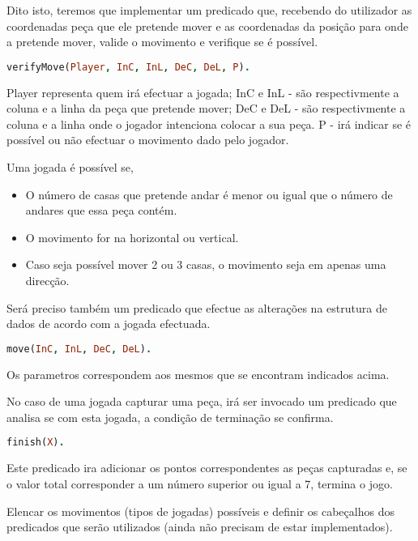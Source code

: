 \documentclass[a4paper]{article}
\begin{document}
Dito isto, teremos que implementar um predicado que, recebendo do utilizador as coordenadas peça que ele pretende mover e as coordenadas da posição para onde a pretende mover, valide o movimento e verifique se é possível.
\bigskip
\begin{lstlisting}[language=Prolog]
verifyMove(Player, InC, InL, DeC, DeL, P).
\end{lstlisting}
\bigskip

Player representa quem irá efectuar a jogada;
\newline
InC e InL - são respectivmente a coluna e a linha da peça que pretende mover;\newline
DeC e DeL - são respectivmente a coluna e a linha onde o jogador intenciona 		colocar a sua peça.\newline
P - irá indicar se é possível ou não efectuar o movimento dado pelo jogador.
\bigskip

Uma jogada é possível se,
\begin{itemize}
	\item O número de casas que pretende andar é menor ou igual que o número de andares que essa peça contém.
	\item O movimento for na horizontal ou vertical.
	\item Caso seja possível mover 2 ou 3 casas, o movimento seja em apenas uma direcção.
	
\end{itemize}
\bigskip

Será preciso também um predicado que efectue as alterações na estrutura de dados de acordo com a jogada efectuada.
\bigskip
\begin{lstlisting}[language=Prolog]
move(InC, InL, DeC, DeL).
\end{lstlisting}
\bigskip

Os parametros correspondem aos mesmos que se encontram indicados acima.
\bigskip

No caso de uma jogada capturar uma peça, irá ser invocado um predicado que analisa se com esta jogada, a condição de terminação se confirma.
\begin{lstlisting}[language=Prolog]
finish(X).
\end{lstlisting}
\newline
Este predicado ira adicionar os pontos correspondentes as peças capturadas e, se o valor total corresponder a um número superior ou igual a 7, termina o jogo.

\bigskip
Elencar os movimentos (tipos de jogadas) possíveis e definir os cabeçalhos dos predicados que serão utilizados (ainda não precisam de estar implementados).
\end{document}
